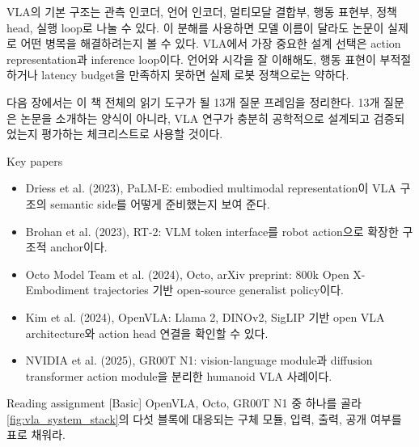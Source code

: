 VLA의 기본 구조는 관측 인코더, 언어 인코더, 멀티모달 결합부, 행동 표현부, 정책 head, 실행 loop로 나눌 수 있다. 이 분해를 사용하면 모델 이름이 달라도 논문이 실제로 어떤 병목을 해결하려는지 볼 수 있다. VLA에서 가장 중요한 설계 선택은 action representation과 inference loop이다. 언어와 시각을 잘 이해해도, 행동 표현이 부적절하거나 latency budget을 만족하지 못하면 실제 로봇 정책으로는 약하다.

다음 장에서는 이 책 전체의 읽기 도구가 될 13개 질문 프레임을 정리한다. 13개 질문은 논문을 소개하는 양식이 아니라, VLA 연구가 충분히 공학적으로 설계되고 검증되었는지 평가하는 체크리스트로 사용할 것이다.

\begin{sourcebox}{Key papers}
\begin{itemize}
  \item Driess et al. (2023), PaLM-E: embodied multimodal representation이 VLA 구조의 semantic side를 어떻게 준비했는지 보여 준다.
  \item Brohan et al. (2023), RT-2: VLM token interface를 robot action으로 확장한 구조적 anchor이다.
  \item Octo Model Team et al. (2024), Octo, arXiv preprint: 800k Open X-Embodiment trajectories 기반 open-source generalist policy이다.
  \item Kim et al. (2024), OpenVLA: Llama 2, DINOv2, SigLIP 기반 open VLA architecture와 action head 연결을 확인할 수 있다.
  \item NVIDIA et al. (2025), GR00T N1: vision-language module과 diffusion transformer action module을 분리한 humanoid VLA 사례이다.
\end{itemize}
\end{sourcebox}

\begin{assignmentbox}{Reading assignment [Basic]}
OpenVLA, Octo, GR00T N1 중 하나를 골라 \cref{fig:vla_system_stack}의 다섯 블록에 대응되는 구체 모듈, 입력, 출력, 공개 여부를 표로 채워라.
\end{assignmentbox}
